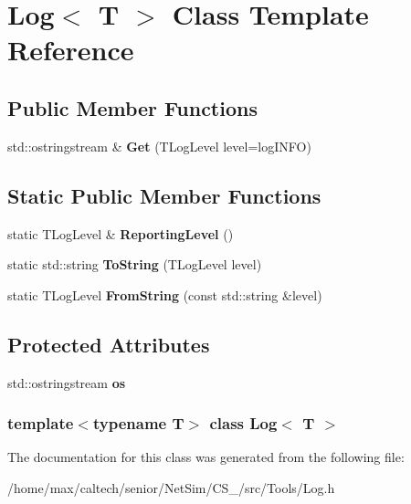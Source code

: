 \hypertarget{classLog}{\section{\-Log$<$ \-T $>$ \-Class \-Template \-Reference}
\label{classLog}
}
\subsection*{\-Public \-Member \-Functions}
\begin{DoxyCompactItemize}
\item 
\hypertarget{classLog_af1e91af54d9f85caaa661f794b37bffb}{std\-::ostringstream \& {\bfseries \-Get} (\-T\-Log\-Level level=log\-I\-N\-F\-O)}\label{classLog_af1e91af54d9f85caaa661f794b37bffb}

\end{DoxyCompactItemize}
\subsection*{\-Static \-Public \-Member \-Functions}
\begin{DoxyCompactItemize}
\item 
\hypertarget{classLog_a7e74a1454fd3d52a408eaa1c04ab4d23}{static \-T\-Log\-Level \& {\bfseries \-Reporting\-Level} ()}\label{classLog_a7e74a1454fd3d52a408eaa1c04ab4d23}

\item 
\hypertarget{classLog_aa889a30fd8ee83904e193ec5e9446216}{static std\-::string {\bfseries \-To\-String} (\-T\-Log\-Level level)}\label{classLog_aa889a30fd8ee83904e193ec5e9446216}

\item 
\hypertarget{classLog_a684966272ade00c32c6e9744eb6b3e9c}{static \-T\-Log\-Level {\bfseries \-From\-String} (const std\-::string \&level)}\label{classLog_a684966272ade00c32c6e9744eb6b3e9c}

\end{DoxyCompactItemize}
\subsection*{\-Protected \-Attributes}
\begin{DoxyCompactItemize}
\item 
\hypertarget{classLog_a01de1c92999fe0c55e5b4a50ffe02336}{std\-::ostringstream {\bfseries os}}\label{classLog_a01de1c92999fe0c55e5b4a50ffe02336}

\end{DoxyCompactItemize}
\subsubsection*{template$<$typename \-T$>$ class Log$<$ T $>$}



\-The documentation for this class was generated from the following file\-:\begin{DoxyCompactItemize}
\item 
/home/max/caltech/senior/\-Net\-Sim/\-C\-S\-\_/src/\-Tools/\-Log.\-h\end{DoxyCompactItemize}
